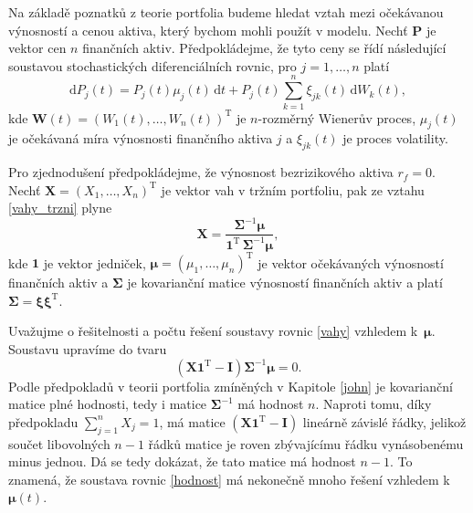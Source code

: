 \documentclass[a4paper,12pt]{report}
\theoremstyle{definition} \newtheorem{definice}[veta]{Definice}
\theoremstyle{remark}
\begin{document}
Na základě poznatků z teorie portfolia budeme hledat vztah mezi očekávanou výnosností a cenou aktiva, který bychom mohli použít v modelu.
Nechť $\boldsymbol{P}$ je vektor cen $n$ finančních aktiv.
Předpokládejme, že tyto ceny se řídí následující soustavou stochastických diferenciálních rovnic, pro $j=1,\dots,n$ platí
\begin{equation} \label{SDE}
\mathrm{d}P_j(t)=P_j(t)\mu_j(t)\,\mathrm{d}t+P_j(t)\sum_{k=1}^{n}\xi_{jk}(t)\,\mathrm{d}W_k(t),
\end{equation}
kde $\boldsymbol{W}(t)=(W_1(t),\dots,W_n(t))^\mathrm{T}$ je $n$-rozměrný Wienerův proces, $\mu_j(t)$ je očekávaná míra výnosnosti finančního aktiva $j$ a $\xi_{jk}(t)$ je proces volatility. 

Pro zjednodušení předpokládejme, že výnosnost bezrizikového aktiva $r_f=0$.
Nechť $\boldsymbol{X}=(X_1,\dots,X_n)^\mathrm{T}$ je vektor vah v tržním portfoliu, pak ze vztahu \eqref{vahy_trzni} plyne
\begin{equation} \label{vahy}
\boldsymbol{X}=\frac{\boldsymbol{\Sigma}^{-1}\boldsymbol{\mu}}{\boldsymbol{1}^\mathrm{T}\,\boldsymbol{\Sigma}^{-1}\boldsymbol{\mu}},
\end{equation}
kde $\boldsymbol{1}$ je vektor jedniček, $\boldsymbol{\mu}=(\mu_1,\dots,\mu_n)^\mathrm{T}$ je vektor očekávaných výnosností finančních aktiv a $\boldsymbol{\Sigma}$ je kovarianční matice výnosností finančních aktiv a platí $\boldsymbol{\Sigma}=\boldsymbol{\xi}\boldsymbol{\xi}^\mathrm{T}$.

Uvažujme o řešitelnosti a počtu řešení soustavy rovnic \eqref{vahy} vzhledem k~$\boldsymbol{\mu}$.
Soustavu upravíme do tvaru %
\begin{equation} \label{hodnost}
\left(\boldsymbol{X}\boldsymbol{1}^\mathrm{T}-\mathbf{I}\right)\boldsymbol{\Sigma}^{-1}\boldsymbol{\mu}=0.
\end{equation}
Podle předpokladů v teorii portfolia zmíněných v Kapitole \ref{john} je kovarianční matice plné hodnosti, tedy i matice $\boldsymbol{\Sigma}^{-1}$ má hodnost $n$.
Naproti tomu, díky předpokladu $\sum_{j=1}^nX_j=1$, má matice $\left(\boldsymbol{X}\boldsymbol{1}^\mathrm{T}-\mathbf{I}\right)$ lineárně závislé řádky, jelikož
součet libovolných $n-1$ řádků matice  je roven zbývajícímu řádku vynásobenému minus jednou.
Dá se tedy dokázat, že tato matice má hodnost $n-1$.
To znamená, že soustava rovnic \eqref{hodnost} má nekonečně mnoho řešení vzhledem k $\boldsymbol{\mu}(t)$.
\end{document}
